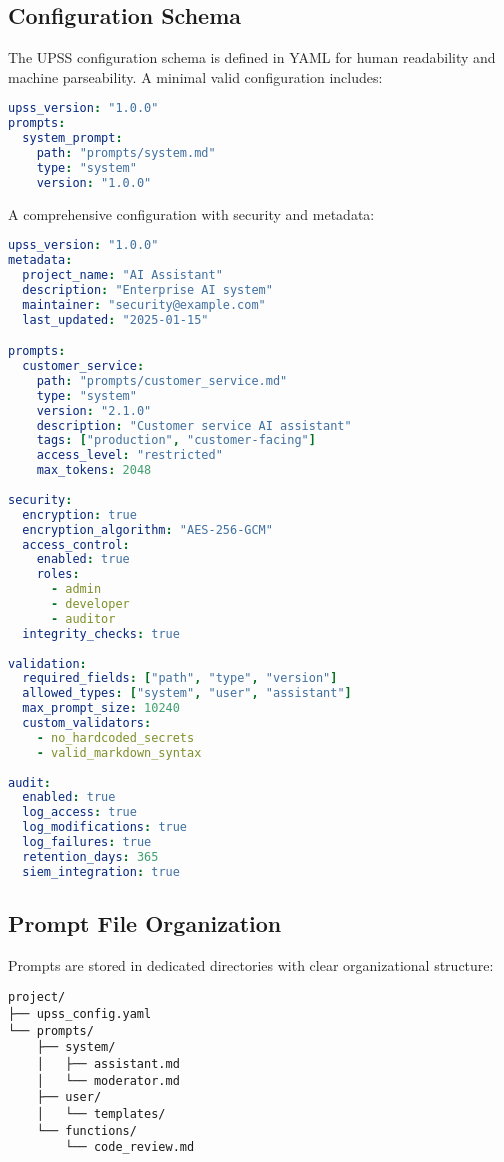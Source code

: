 \subsection{Configuration Schema}

The UPSS configuration schema is defined in YAML for human readability and machine parseability. A minimal valid configuration includes:

\begin{lstlisting}[language=yaml,caption=Minimal UPSS Configuration]
upss_version: "1.0.0"
prompts:
  system_prompt:
    path: "prompts/system.md"
    type: "system"
    version: "1.0.0"
\end{lstlisting}

A comprehensive configuration with security and metadata:

\begin{lstlisting}[language=yaml,caption=Comprehensive UPSS Configuration]
upss_version: "1.0.0"
metadata:
  project_name: "AI Assistant"
  description: "Enterprise AI system"
  maintainer: "security@example.com"
  last_updated: "2025-01-15"

prompts:
  customer_service:
    path: "prompts/customer_service.md"
    type: "system"
    version: "2.1.0"
    description: "Customer service AI assistant"
    tags: ["production", "customer-facing"]
    access_level: "restricted"
    max_tokens: 2048
    
security:
  encryption: true
  encryption_algorithm: "AES-256-GCM"
  access_control:
    enabled: true
    roles:
      - admin
      - developer
      - auditor
  integrity_checks: true
  
validation:
  required_fields: ["path", "type", "version"]
  allowed_types: ["system", "user", "assistant"]
  max_prompt_size: 10240
  custom_validators:
    - no_hardcoded_secrets
    - valid_markdown_syntax
    
audit:
  enabled: true
  log_access: true
  log_modifications: true
  log_failures: true
  retention_days: 365
  siem_integration: true
\end{lstlisting}

\subsection{Prompt File Organization}

Prompts are stored in dedicated directories with clear organizational structure:

\begin{verbatim}
project/
├── upss_config.yaml
└── prompts/
    ├── system/
    │   ├── assistant.md
    │   └── moderator.md
    ├── user/
    │   └── templates/
    └── functions/
        └── code_review.md
\end{verbatim}

